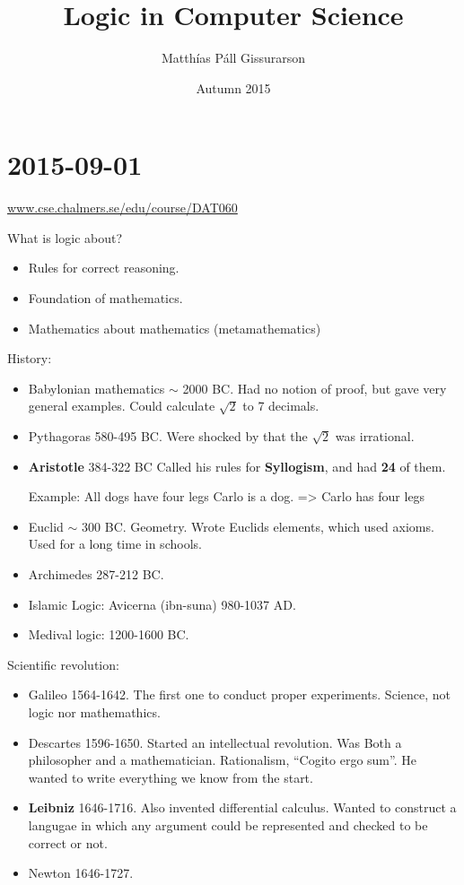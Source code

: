 \documentclass[12pt]{report}
\title{Logic in Computer Science}
\author{Matthías Páll Gissurarson} \date{Autumn 2015}
\begin{document}
\maketitle

\tableofcontents

\chapter{2015-09-01}

\url{www.cse.chalmers.se/edu/course/DAT060}

What is logic about?
\begin{itemize}
  \item Rules for correct reasoning.
  \item Foundation of mathematics.
  \item Mathematics about mathematics (metamathematics)
\end{itemize}

History:
\begin{itemize}
    \item Babylonian mathematics $\sim$ 2000 BC.
      Had no notion of proof, but gave very general examples. Could
      calculate $\sqrt{2}$ to 7 decimals.
    \item Pythagoras 580-495 BC.   Were shocked by that
      the $\sqrt{2}$ was irrational.
    \item \textbf{Aristotle} 384-322 BC
      Called his rules for \textbf{Syllogism}, and had \textbf{24} of them.

      Example: 
        All dogs have four legs
        Carlo is a dog.
        => Carlo has four legs
    \item Euclid $\sim$ 300 BC.  Geometry. Wrote Euclids elements, which
      used axioms. Used for a long time in schools.
    \item Archimedes 287-212 BC.

    \item Islamic Logic:  Avicerna (ibn-suna) 980-1037 AD.
     
    \item Medival logic: 1200-1600 BC.

\end{itemize}

Scientific revolution:
\begin{itemize}
\item Galileo 1564-1642. The first one to conduct proper experiments. Science, not logic nor mathemathics.
\item Descartes 1596-1650. Started an intellectual revolution. Was Both a
  philosopher and a mathematician. Rationalism, ``Cogito ergo sum''.
He wanted to write everything we know from the start.
\item \textbf{Leibniz} 1646-1716. Also invented differential calculus.
 Wanted to construct a langugae in which any argument could be represented
 and checked to be correct or not.
\item Newton 1646-1727.
\end{itemize}
\end{document}
